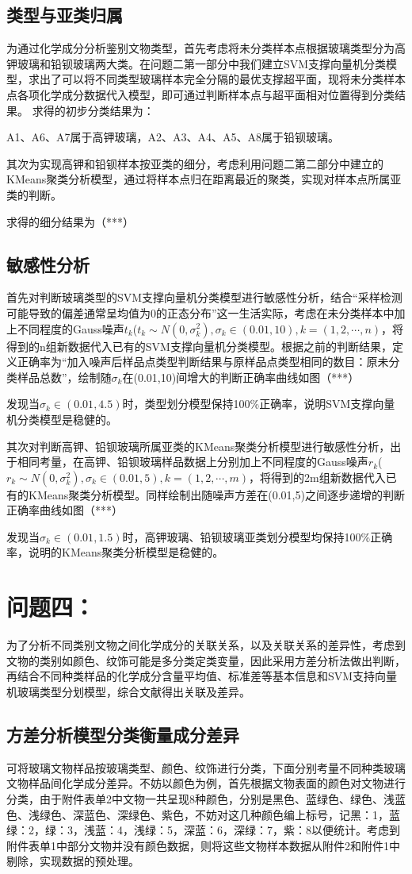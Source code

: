 \documentclass[withoutpreface,bwprint]{cumcmthesis}
\begin{document}
\subsection{类型与亚类归属}
为通过化学成分分析鉴别文物类型，首先考虑将未分类样本点根据玻璃类型分为高钾玻璃和铅钡玻璃两大类。在问题二第一部分中我们建立SVM支撑向量机分类模型，求出了可以将不同类型玻璃样本完全分隔的最优支撑超平面，现将未分类样本点各项化学成分数据代入模型，即可通过判断样本点与超平面相对位置得到分类结果。
求得的初步分类结果为：

A1、A6、A7属于高钾玻璃，A2、A3、A4、A5、A8属于铅钡玻璃。

其次为实现高钾和铅钡样本按亚类的细分，考虑利用问题二第二部分中建立的KMeans聚类分析模型，通过将样本点归在距离最近的聚类，实现对样本点所属亚类的判断。

求得的细分结果为（***）
\subsection{敏感性分析}
首先对判断玻璃类型的SVM支撑向量机分类模型进行敏感性分析，结合“采样检测可能导致的偏差通常呈均值为0的正态分布”这一生活实际，考虑在未分类样本中加上不同程度的Gauss噪声$t_k$($t_k\sim N(0 ,\sigma_k^2 ),\sigma_k\in(0.01,10),k=(1,2,\cdots,n)$，将得到的n组新数据代入已有的SVM支撑向量机分类模型。根据之前的判断结果，定义正确率为“加入噪声后样品点类型判断结果与原样品点类型相同的数目：原未分类样品总数”，绘制随$\sigma_k$在(0.01,10)间增大的判断正确率曲线如图（***）

发现当$\sigma_k\in(0.01,4.5)$时，类型划分模型保持100\%正确率，说明SVM支撑向量机分类模型是稳健的。

其次对判断高钾、铅钡玻璃所属亚类的KMeans聚类分析模型进行敏感性分析，出于相同考量，在高钾、铅钡玻璃样品数据上分别加上不同程度的Gauss噪声$r_k$($r_k\sim N(0 ,\sigma_k^2 ),\sigma_k\in(0.01,5),k=(1,2,\cdots,m)$，将得到的2m组新数据代入已有的KMeans聚类分析模型。同样绘制出随噪声方差在(0.01,5)之间逐步递增的判断正确率曲线如图（***）

发现当$\sigma_k\in(0.01,1.5)$时，高钾玻璃、铅钡玻璃亚类划分模型均保持100\%正确率，说明的KMeans聚类分析模型是稳健的。
\section{问题四：}
为了分析不同类别文物之间化学成分的关联关系，以及关联关系的差异性，考虑到文物的类别如颜色、纹饰可能是多分类定类变量，因此采用方差分析法做出判断，再结合不同种类样品的化学成分含量平均值、标准差等基本信息和SVM支持向量机玻璃类型分划模型，综合文献得出关联及差异。
\subsection{方差分析模型分类衡量成分差异}
可将玻璃文物样品按玻璃类型、颜色、纹饰进行分类，下面分别考量不同种类玻璃文物样品间化学成分差异。不妨以颜色为例，首先根据文物表面的颜色对文物进行分类，由于附件表单2中文物一共呈现8种颜色，分别是黑色、蓝绿色、绿色、浅蓝色、浅绿色、深蓝色、深绿色、紫色，不妨对这几种颜色编上标号，记黑：1，蓝绿：2，绿：3，浅蓝：4，浅绿：5，深蓝：6，深绿：7，紫：8以便统计。考虑到附件表单1中部分文物并没有颜色数据，则将这些文物样本数据从附件2和附件1中剔除，实现数据的预处理。
\end{document}
